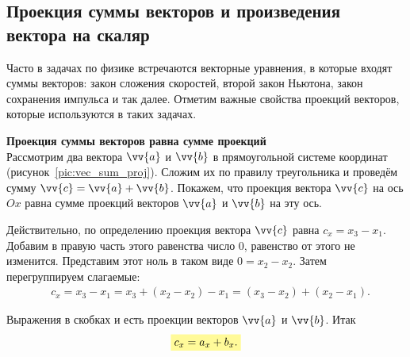 \clearpage

\subsection{Проекция суммы векторов и произведения вектора на скаляр}

Часто в задачах по физике встречаются векторные уравнения, в которые
входят суммы векторов: закон сложения скоростей, второй закон Ньютона,
закон сохранения импульса и так далее. Отметим важные свойства проекций
векторов, которые используются в таких задачах.

\textbf{Проекция суммы векторов равна сумме проекций}\\
Рассмотрим два вектора $\vv{a}$ и $\vv{b}$ в прямоугольной системе координат
(рисунок~\ref{pic:vec_sum_proj}). Сложим их по правилу треугольника и проведём
сумму $\vv{c} = \vv{a}+\vv{b}$. Покажем, что проекция вектора $\vv{c}$ на ось $Ox$
равна сумме проекций векторов $\vv{a}$ и $\vv{b}$ на эту ось.

Действительно, по определению проекция вектора $\vv{c}$ равна $c_x = x_3 - x_1$. Добавим
в правую часть этого равенства число 0, равенство от этого не изменится. Представим этот ноль
в таком виде $0 = x_2 - x_2$. Затем перегруппируем слагаемые:
\begin{align}
&c_x = x_3 - x_1 = x_3 + (x_2 - x_2) - x_1 = (x_3 - x_2) + (x_2 - x_1).
\end{align}

Выражения в скобках и есть проекции векторов $\vv{a}$ и $\vv{b}$. Итак
{\large
\begin{align}
  \hly{c_x = a_x + b_x.}
\end{align}
}

